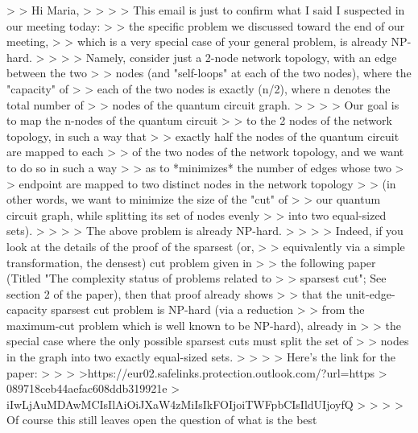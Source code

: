  > > Hi Maria,
> >
> > This email is just to confirm what I said I suspected in our meeting today:
> > the specific problem we discussed toward the end of our meeting,
> > which is a very special case of your general problem, is already NP-hard.
> >
> > Namely, consider just a 2-node network topology, with an edge between the two
> > nodes (and "self-loops" at each of the two nodes), where the "capacity" of
> > each of the two nodes is exactly (n/2), where n denotes the total number of
> > nodes of the quantum circuit graph.
> >
> > Our goal is to map the n-nodes of the quantum circuit
> > to the 2 nodes of the network topology, in such a way that
> > exactly half the nodes of the quantum circuit are mapped to each
> > of the two nodes of the network topology,  and we want to do so in such a way
> > as to *minimizes* the number of edges whose two
> > endpoint  are mapped to two distinct nodes in the network topology
> > (in other words, we want to minimize the size of the "cut" of
> > our quantum circuit graph, while splitting its set of nodes evenly
> > into two equal-sized sets).
> >
> > The above problem is already NP-hard.
> >
> > Indeed, if you look at the details of the proof of the sparsest (or,
> > equivalently via a simple transformation, the densest) cut problem given in
> > the following paper (Titled "The complexity status of problems related to
> > sparsest cut"; See section 2 of the paper), then that proof already shows
> > that the unit-edge-capacity sparsest cut problem is NP-hard (via a reduction
> > from the maximum-cut problem which is well known to be NP-hard), already in
> > the special case where the only possible sparsest cuts must split the set of
> > nodes in the graph into two exactly equal-sized sets.
> >
> > Here's the link for the paper:
> >
> >https://eur02.safelinks.protection.outlook.com/?url=https%
> 089718ceb44aefac608ddb319921e%
> iIwLjAuMDAwMCIsIlAiOiJXaW4zMiIsIkFOIjoiTWFpbCIsIldUIjoyfQ%
> >
> > Of course this still leaves open the question of what is the best

